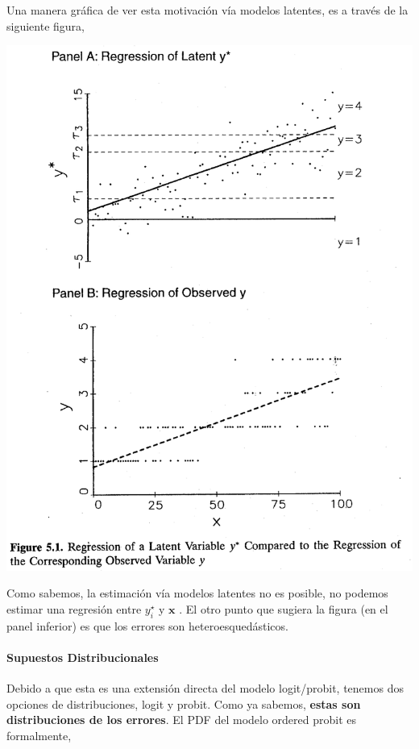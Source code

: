 \documentclass[onesided]{article}\usepackage[]{graphicx}\usepackage[]{color}
\makeatletter
\def\maxwidth{ %
  \ifdim\Gin@nat@width>\linewidth
    \linewidth
  \else
    \Gin@nat@width
  \fi
}
\makeatother
\begin{document}
Una manera gr\'afica de ver esta motivaci\'on v\'ia modelos latentes, es a trav\'es de la siguiente figura,

{\centering \includegraphics[width=\maxwidth]{latente_observed.png}}

Como sabemos, la estimaci\'on v\'ia modelos latentes no es posible, no podemos estimar una regresi\'on entre $y_{i}^{\star}$ y $\boldsymbol{x}$ \parencite[117]{Long:1997wv}. El otro punto que sugiera la figura (en el panel inferior) es que los errores son heteroesqued\'asticos. 

\paragraph{Supuestos Distribucionales} Debido a que esta es una extensi\'on directa del modelo logit/probit, tenemos dos opciones de distribuciones, logit y probit. Como ya sabemos, {\bf estas son distribuciones de los errores}. El PDF del modelo ordered probit es formalmente,
\end{document}
